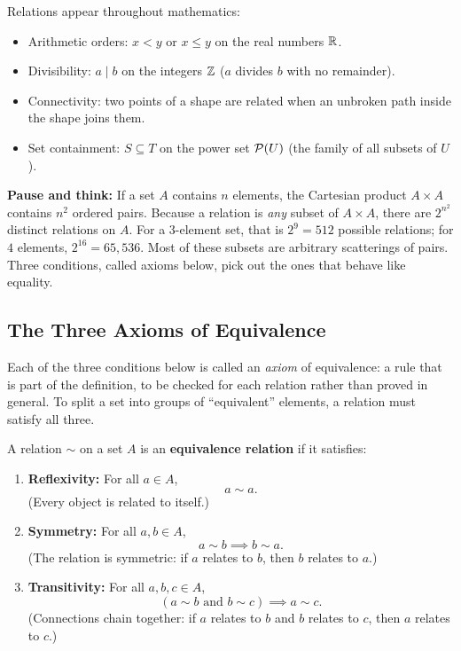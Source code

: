 Relations appear throughout mathematics:
\begin{itemize}
\item Arithmetic orders: $x < y$ or $x \le y$ on the real numbers $\mathbb{R}$.
\item Divisibility: $a \mid b$ on the integers $\mathbb{Z}$ ($a$ divides $b$ with no remainder).
\item Connectivity: two points of a shape are related when an unbroken path inside the shape joins them.
\item Set containment: $S \subseteq T$ on the power set $\mathcal{P}(U)$ (the family of all subsets of $U$).
\end{itemize}

\begin{recoverybox}
\textbf{Pause and think:} If a set $A$ contains $n$ elements, the Cartesian product $A \times A$ contains $n^2$ ordered pairs. Because a relation is \emph{any} subset of $A \times A$, there are $2^{n^2}$ distinct relations on $A$. For a 3-element set, that is $2^9 = 512$ possible relations; for $4$ elements, $2^{16} = 65{,}536$. Most of these subsets are arbitrary scatterings of pairs. Three conditions, called axioms below, pick out the ones that behave like equality.
\end{recoverybox}

\subsection{The Three Axioms of Equivalence}

Each of the three conditions below is called an \emph{axiom} of equivalence: a rule that is part of the definition, to be checked for each relation rather than proved in general. To split a set into groups of ``equivalent'' elements, a relation must satisfy all three.

\begin{definition}
A relation $\sim$ on a set $A$ is an \textbf{equivalence relation} if it satisfies:
\begin{enumerate}[label=(\roman*)]
\item \textbf{Reflexivity:} For all $a \in A$,
\[
a \sim a.
\]
(Every object is related to itself.)
\item \textbf{Symmetry:} For all $a, b \in A$,
\[
a \sim b \implies b \sim a.
\]
(The relation is symmetric: if $a$ relates to $b$, then $b$ relates to $a$.)
\item \textbf{Transitivity:} For all $a, b, c \in A$,
\[
(a \sim b \text{ and } b \sim c) \implies a \sim c.
\]
(Connections chain together: if $a$ relates to $b$ and $b$ relates to $c$, then $a$ relates to $c$.)
\end{enumerate}
\end{definition}

